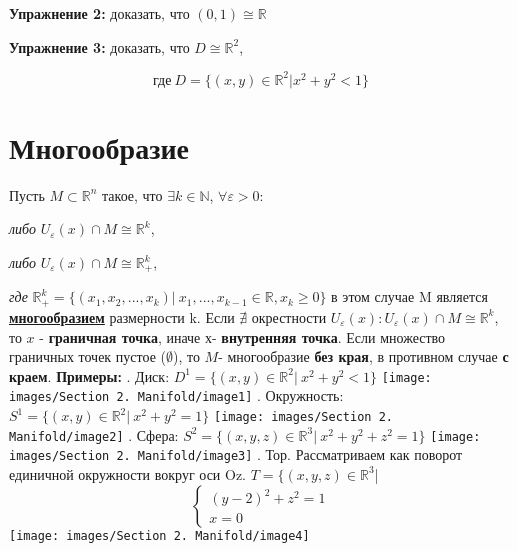 \documentclass[12pt,a4paper]{article}
\begin{document}
	\textbf{\large{Упражнение 2:}} доказать, что $(0,1) \cong  \mathbb{R}$
	
	\textbf{\large{Упражнение 3:}} доказать, что $D\cong \mathbb{R}^2$,
	
	\[ \textit{где}~ D =\{(x,y)\in \mathbb{R}^2 | x^2 + y^2 < 1\} \]
	
	\newpage
\section*{Многообразие}

Пусть \(M \subset \mathbb{R}^n\) такое, что \(\exists k\in \mathbb{N}\), $\forall \varepsilon >0$:
\begin{center}
 \textit{либо} \(U_{\varepsilon} (x)\cap M \cong \mathbb{R}^k\),
\end{center}
\begin{center}
 \textit{либо} \(U_{\varepsilon} (x)\cap M \cong \mathbb{R}_{+}^k\),
\end{center}
\textit{где} \(\mathbb{R}_{+}^k = \{(x_1,x_2,...,x_k)|~ x_1,..., x_{k-1} \in \mathbb{R}, x_k\ge 0\}\)
\newline в этом случае M является \underline{\textbf{многообразием}} размерности k.
\newline Если \(\nexists\) окрестности \(U_{\varepsilon} (x): U_{\varepsilon} (x)\cap M \cong \mathbb{R}^k\), то \(x\) - \textbf{граничная точка}, иначе \(х\)- \textbf{внутренняя точка}.
\newline Если множество граничных точек пустое (\(\emptyset\)), то \(M\)- многообразие \textbf{без края}, в противном случае \textbf{с краем}.
\newline \textbf{Примеры:}
. Диск: $D^1 = \{(x,y) \in \mathbb{R}^2 |~ x^2 + y^2 < 1 \} $
\newline \texttt{[image: images/Section 2. Manifold/image1]}
. Окружность: \(S^1 = \{(x,y)\in \mathbb{R}^2|~ x^2 + y^2 =1\}\) 
\newline \texttt{[image: images/Section 2. Manifold/image2]}
. Сфера: \(S^2 = \{(x,y,z)\in\mathbb{R}^3|~ x^2+y^2+z^2=1\}\)
\newline \texttt{[image: images/Section 2. Manifold/image3]}
. Тор. Рассматриваем как поворот единичной окружности вокруг оси Oz.
\(T=\{(x,y,z)\in \mathbb{R}^3\)|
\begin{equation*}
\begin{cases}
(y - 2)^2 + z^2=1
\\
x =0
\end{cases}
\end{equation*}
\texttt{[image: images/Section 2. Manifold/image4]}\\
\end{document}
